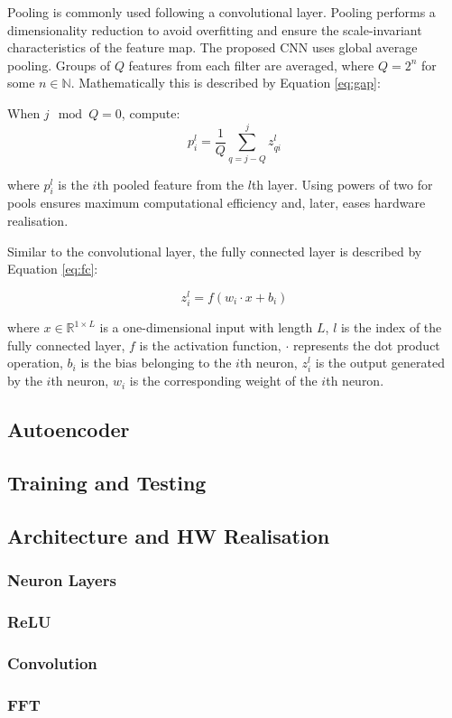 \documentclass[../main.tex]{subfiles}
\begin{document}
Pooling is commonly used following a convolutional layer. Pooling performs a dimensionality reduction to avoid overfitting and ensure the scale-invariant characteristics of the feature map. The proposed CNN uses global average pooling. Groups of $Q$ features from each filter are averaged, where $Q=2^n$ for some $n\in\mathbb{N}$. Mathematically this is described by Equation \ref{eq:gap}: 

When $j\mod Q=0$, compute:
\begin{equation}
    p^l_i = \frac{1}{Q}\sum_{q=j-Q}^{j}{z^l_{qi}}
    \label{eq:gap}
\end{equation}

where $p^l_i$ is the $i$th pooled feature from the $l$th layer. Using powers of two for pools ensures maximum computational efficiency and, later, eases hardware realisation.

Similar to the convolutional layer, the fully connected layer is described by Equation \ref{eq:fc}:

\begin{equation}
    z^l_i=f(w_i\cdot x+b_i)
    \label{eq:fc}
\end{equation}

where $x\in\mathbb{R}^{1\times L}$ is a one-dimensional input with length $L$, $l$ is the index of the fully connected layer, $f$ is the activation function, $\cdot$ represents the dot product operation, $b_i$ is the bias belonging to the $i$th neuron, $z^l_i$ is the output generated by the $i$th neuron, $w_i$ is the corresponding weight of the $i$th neuron.




\subsection{Autoencoder}

\subsection{Training and Testing}

\subsection{Architecture and HW Realisation}

\subsubsection{Neuron Layers}

\subsubsection{ReLU}

\subsubsection{Convolution}

\subsubsection{FFT}

\onecolumn

\biblio
\end{document}
